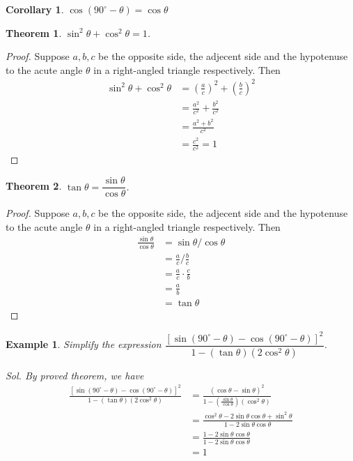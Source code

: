 \documentclass[12pt]{article}
\newtheorem*{theorem}{Theorem}
\newtheorem*{corollary}{Corollary}
\newtheorem*{example}{Example}
\begin{document}
    \begin{corollary}
        $\cos(90^\circ - \theta)=\cos{\theta}$
    \end{corollary}

    \begin{theorem}
        $\sin^2{\theta}+\cos^2{\theta}=1$.
    \end{theorem}

    \begin{proof}
        Suppose $a,b,c$ be the opposite side, the adjecent side and the hypotenuse to the acute angle $\theta$ in a right-angled triangle respectively. Then \begin{align*}
            \sin^2{\theta}+\cos^2{\theta}&=(\frac{a}{c})^2+(\frac{b}{c})^2\\
            &=\frac{a^2}{c^2}+\frac{b^2}{c^2}\\
            &=\frac{a^2+b^2}{c^2}\\
            &=\frac{c^2}{c^2}=1
        \end{align*}
    \end{proof}

    \begin{theorem}
        $\tan{\theta}=\dfrac{\sin{\theta}}{\cos{\theta}}$.
    \end{theorem}

    \begin{proof}
        Suppose $a,b,c$ be the opposite side, the adjecent side and the hypotenuse to the acute angle $\theta$ in a right-angled triangle respectively. Then \begin{align*}
            \frac{\sin{\theta}}{\cos{\theta}}&=\sin{\theta}/ \cos{\theta}\\
            &=\frac{a}{c}/ \frac{b}{c}\\
            &=\frac{a}{c}\cdot \frac{c}{b}\\
            &=\frac{a}{b}\\
            &=\tan{\theta}
        \end{align*}
    \end{proof}

    \begin{example}
        Simplify the expression $\dfrac{[\sin(90^\circ - \theta) - \cos(90^\circ - \theta)]^2}{1-(\tan{\theta})(2\cos^2{\theta})}$.

        \textit{ Sol. }By proved theorem, we have \begin{align*}
            \frac{[\sin(90^\circ - \theta) - \cos(90^\circ - \theta)]^2}{1-(\tan{\theta})(2\cos^2{\theta})} &= \frac{(\cos{\theta}-\sin{\theta})^2}{1-(\frac{\sin{\theta}}{\cos{\theta}})(\cos^2{\theta})}\\
            &= \frac{\cos^2{\theta}-2\sin{\theta}\cos{\theta}+\sin^2{\theta}}{1-2\sin{\theta}\cos{\theta}}\\
            &= \frac{1-2\sin{\theta}\cos{\theta}}{1-2\sin{\theta}\cos{\theta}}\\
            &= 1
        \end{align*}
    \end{example}
\end{document}
